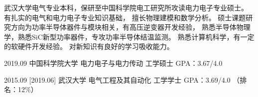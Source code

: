 \documentclass[zh]{resume}
\begin{document}
\makeheader

{\onehalfspacing\hspace{2em}%
武汉大学电气专业本科，保研至中国科学院电工研究所攻读电力电子专业硕士。
有扎实的电气和电力电子专业知识基础，
擅长物理建模和数学分析。
硕士课题研究方向为功率半导体器件与模块相关，有高压逆变器开发经验，
熟悉半导体物理学，熟悉SiC新型功率器件，专攻功率半导体结温监测。
熟悉计算机科学，有一定的软硬件开发经验。
对新知识有良好的学习吸收能力。
\par}

\begin{educations}
  \education%
    {2019.09}%
    {中国科学院大学}%
    {电力电子与电力传动}%
    {工学硕士}%
    {GPA：3.67/4.0}
    

  \separator{0.1ex}
  \education%
    {2015.09}%
    [2019.06]%
    {武汉大学}%
    {电气工程及其自动化}%
    {工学学士}%
    {GPA：3.69/4.0 （排名：12\%）}
\end{educations}

\begin{competences}

    
\end{competences}
\end{document}
